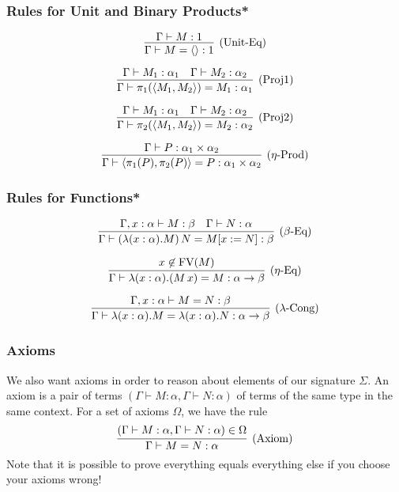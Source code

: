 \documentclass[aspectratio=169]{beamer}
\begin{document}
\begin{frame}
\frametitle{Rules for Unit and Binary Products*}

\[
\infer[\text{(Unit-Eq)}]{\Gamma \vdash M = \langle\rangle : 1}{\Gamma \vdash M : 1}
\]

\[
\infer[\text{(Proj1)}]{\Gamma \vdash \pi_1(\langle M_1, M_2 \rangle) = M_1 : \alpha_1}{\Gamma \vdash M_1 : \alpha_1 & \Gamma \vdash M_2 : \alpha_2}
\]

\[
\infer[\text{(Proj2)}]{\Gamma \vdash \pi_2(\langle M_1, M_2 \rangle) = M_2 : \alpha_2}{\Gamma \vdash M_1 : \alpha_1 & \Gamma \vdash M_2 : \alpha_2}
\]

\[
\infer[\text{($\eta$-Prod)}]{\Gamma \vdash \langle \pi_1(P), \pi_2(P) \rangle = P : \alpha_1 \times \alpha_2}{\Gamma \vdash P : \alpha_1 \times \alpha_2}
\]
\end{frame}

\begin{frame}
\frametitle{Rules for Functions*}

\[
\infer[\text{($\beta$-Eq)}]{\Gamma \vdash (\lambda (x : \alpha). M) \, N = M[x := N] : \beta}{\Gamma, x : \alpha \vdash M : \beta & \Gamma \vdash N : \alpha}
\]

\[
\infer[\text{($\eta$-Eq)}]{\Gamma \vdash \lambda (x : \alpha). (M \, x) = M : \alpha \rightarrow \beta}{x \not\in \text{FV}(M)}
\]

\[
\infer[\text{($\lambda$-Cong)}]{\Gamma \vdash \lambda (x : \alpha). M = \lambda (x : \alpha). N : \alpha \rightarrow \beta}{\Gamma, x : \alpha \vdash M = N : \beta}
\]

\end{frame}

\begin{frame}
\frametitle{Axioms}
We also want axioms in order to reason about elements of our signature $\Sigma$.
An axiom is a pair of terms $\left(\Gamma \vdash M : \alpha, \Gamma \vdash N : \alpha\right)$ of terms of the same type in the same context.
For a set of axioms $\Omega$, we have the rule
\[
\infer[\text{(Axiom)}]{\Gamma \vdash M = N : \alpha}{\left(\Gamma \vdash M : \alpha, \Gamma \vdash N : \alpha\right) \in \Omega}
\]
Note that it is possible to prove everything equals everything else if you choose your axioms wrong!
\end{frame}
\end{document}
